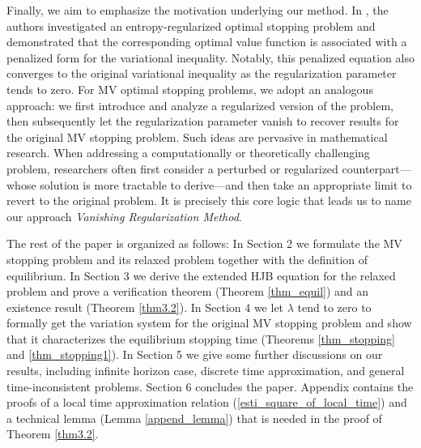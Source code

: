 \documentclass[11pt]{article}
\begin{document}
Finally, we aim to emphasize the motivation underlying our method. In \cite{dong2024randomized}, the authors investigated an entropy-regularized optimal stopping problem and demonstrated that the corresponding optimal value function is associated with a penalized form for the variational inequality. Notably, this penalized equation also converges to the original variational inequality as the regularization parameter tends to zero.	For MV optimal stopping problems, we adopt an analogous approach: we first introduce and analyze a regularized version of the problem, then subsequently let the regularization parameter vanish to recover results for the original MV stopping problem. Such ideas are pervasive in mathematical research. When addressing a computationally or theoretically challenging problem, researchers often first consider a perturbed or regularized counterpart—whose solution is more tractable to derive—and then take an appropriate limit to revert to the original problem. It is precisely this core logic that leads us to name our approach {\it Vanishing Regularization Method}.


The rest of the paper is organized as follows: In Section 2 we formulate the MV stopping problem and its relaxed problem together with the definition of equilibrium. In Section 3 we derive the extended HJB equation for the relaxed problem and prove a verification theorem (Theorem \ref{thm_equil}) and an existence result (Theorem \ref{thm3.2}). In Section 4 we let $\lambda$ tend to zero to formally get the variation system for the original MV stopping problem and show that it characterizes the equilibrium stopping time (Theorems \ref{thm_stopping} and \ref{thm_stopping1}). In Section 5 we give some further discussions on our results, including infinite horizon case, discrete time approximation, and general time-inconsistent problems. Section 6 concludes the paper. Appendix contains the proofs of a local time approximation relation (\ref{esti_square_of_local_time}) and a technical lemma  (Lemma \ref{append_lemma}) that is needed in the proof of Theorem \ref{thm3.2}.
\end{document}
